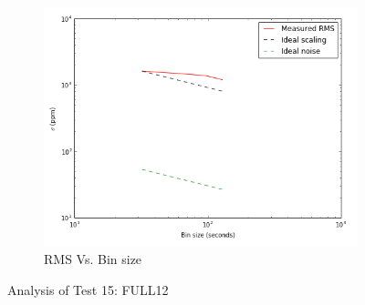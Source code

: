 \documentclass{aastex6}
\begin{document}
\begin{figure}[H]
    \begin{subfigure}{3}
        \includegraphics[scale=0.6]{rms_test15}
        \caption{RMS Vs. Bin size}
    \end{subfigure}
    \caption{Analysis of Test 15: FULL12}
\end{figure}
\end{document}
